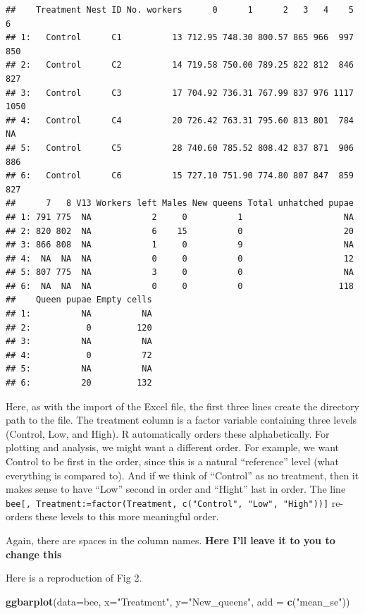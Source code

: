 \documentclass[]{book}
\newenvironment{Shaded}{\begin{snugshade}}{\end{snugshade}}
\newcommand{\KeywordTok}[1]{\textcolor[rgb]{0.13,0.29,0.53}{\textbf{#1}}}
\newcommand{\DataTypeTok}[1]{\textcolor[rgb]{0.13,0.29,0.53}{#1}}
\newcommand{\StringTok}[1]{\textcolor[rgb]{0.31,0.60,0.02}{#1}}
\newcommand{\NormalTok}[1]{#1}
\begin{document}
\begin{verbatim}
##    Treatment Nest ID No. workers      0      1      2   3   4    5    6
## 1:   Control      C1          13 712.95 748.30 800.57 865 966  997  850
## 2:   Control      C2          14 719.58 750.00 789.25 822 812  846  827
## 3:   Control      C3          17 704.92 736.31 767.99 837 976 1117 1050
## 4:   Control      C4          20 726.42 763.31 795.60 813 801  784   NA
## 5:   Control      C5          28 740.60 785.52 808.42 837 871  906  886
## 6:   Control      C6          15 727.10 751.90 774.80 807 847  859  827
##      7   8 V13 Workers left Males New queens Total unhatched pupae
## 1: 791 775  NA            2     0          1                    NA
## 2: 820 802  NA            6    15          0                    20
## 3: 866 808  NA            1     0          9                    NA
## 4:  NA  NA  NA            0     0          0                    12
## 5: 807 775  NA            3     0          0                    NA
## 6:  NA  NA  NA            0     0          0                   118
##    Queen pupae Empty cells
## 1:          NA          NA
## 2:           0         120
## 3:          NA          NA
## 4:           0          72
## 5:          NA          NA
## 6:          20         132
\end{verbatim}

Here, as with the import of the Excel file, the first three lines create
the directory path to the file. The treatment column is a factor
variable containing three levels (Control, Low, and High). R
automatically orders these alphabetically. For plotting and analysis, we
might want a different order. For example, we want Control to be first
in the order, since this is a natural ``reference'' level (what
everything is compared to). And if we think of ``Control'' as no
treatment, then it makes sense to have ``Low'' second in order and
``Hight'' last in order. The line
\texttt{bee{[},\ Treatment:=factor(Treatment,\ c("Control",\ "Low",\ "High")){]}}
re-orders these levels to this more meaningful order.

Again, there are spaces in the column names. \textbf{Here I'll leave it
to you to change this}

Here is a reproduction of Fig 2.

\begin{Shaded}
\begin{Highlighting}[]
\KeywordTok{ggbarplot}\NormalTok{(}\DataTypeTok{data=}\NormalTok{bee, }\DataTypeTok{x=}\StringTok{"Treatment"}\NormalTok{, }\DataTypeTok{y=}\StringTok{"New_queens"}\NormalTok{, }\DataTypeTok{add =} \KeywordTok{c}\NormalTok{(}\StringTok{"mean_se"}\NormalTok{))}
\end{Highlighting}
\end{Shaded}
\end{document}
